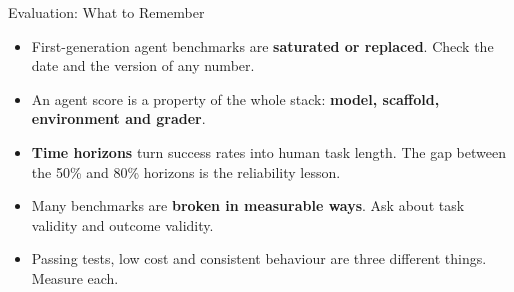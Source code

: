 \begin{frame}{Evaluation: What to Remember}
    \begin{itemize}\itemsep0.6em
        \item First-generation agent benchmarks are \textbf{saturated or replaced}. Check the date and the version of any number.
        \item An agent score is a property of the whole stack: \textbf{model, scaffold, environment and grader}.
        \item \textbf{Time horizons} turn success rates into human task length. The gap between the 50\% and 80\% horizons is the reliability lesson.
        \item Many benchmarks are \textbf{broken in measurable ways}. Ask about task validity and outcome validity.
        \item Passing tests, low cost and consistent behaviour are three different things. Measure each.
    \end{itemize}
    \vspace{0.4em}
\end{frame}
